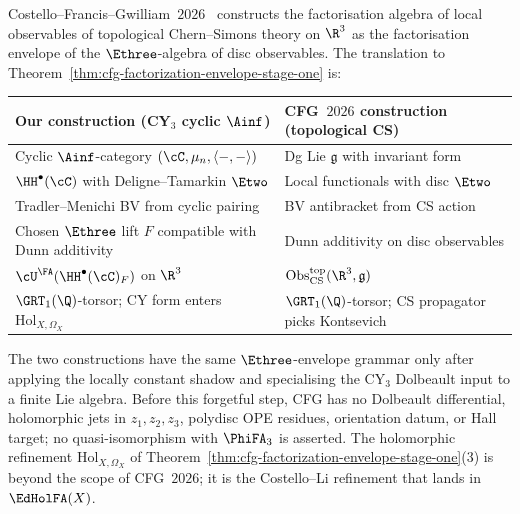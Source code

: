 \begin{remark}
\label{rem:cfg-factorization-envelope-side-by-side}
Costello--Francis--Gwilliam~$2026$~\cite{CFG2026} constructs the
factorisation algebra of local observables of topological
Chern--Simons theory on $\R^3$ as the factorisation envelope of the
$\Ethree$-algebra of disc observables. The translation to
Theorem~\ref{thm:cfg-factorization-envelope-stage-one} is:
\begin{center}
\begin{tabular}{p{5cm}|p{8.5cm}}
\textbf{Our construction (CY$_3$ cyclic $\Ainf$)} &
\textbf{CFG~$2026$ construction (topological CS)} \\ \hline
Cyclic $\Ainf$-category
$(\cC,\mu_n,\langle-,-\rangle)$ &
Dg Lie $\mathfrak g$ with invariant form \\ \hline
$\HH^\bullet(\cC)$ with Deligne--Tamarkin $\Etwo$ &
Local functionals with disc $\Etwo$ \\ \hline
Tradler--Menichi BV from cyclic pairing &
BV antibracket from CS action \\ \hline
Chosen $\Ethree$ lift $F$ compatible with Dunn additivity &
Dunn additivity on disc observables \\ \hline
$\cU^\FA(\HH^\bullet(\cC)_F)$ on $\R^3$ &
$\mathrm{Obs}^{\mathrm{top}}_{\mathrm{CS}}(\R^3,\mathfrak g)$ \\ \hline
$\GRT_1(\Q)$-torsor; CY form enters $\mathrm{Hol}_{X,\Omega_X}$ &
$\GRT_1(\Q)$-torsor; CS propagator picks Kontsevich \\ \hline
\end{tabular}
\end{center}
The two constructions have the same $\Ethree$-envelope grammar only
after applying the locally constant shadow and specialising the CY$_3$
Dolbeault input to a finite Lie algebra. Before this forgetful step,
CFG has no Dolbeault differential, holomorphic jets in
$z_1,z_2,z_3$, polydisc OPE residues, orientation datum, or Hall
target; no quasi-isomorphism with $\PhiFA_3$ is asserted. The
holomorphic refinement $\mathrm{Hol}_{X,\Omega_X}$ of
Theorem~\ref{thm:cfg-factorization-envelope-stage-one}\textup{(3)} is
beyond the scope of CFG~$2026$; it is the Costello--Li refinement that
lands in $\EdHolFA(X)$.
\end{remark}

